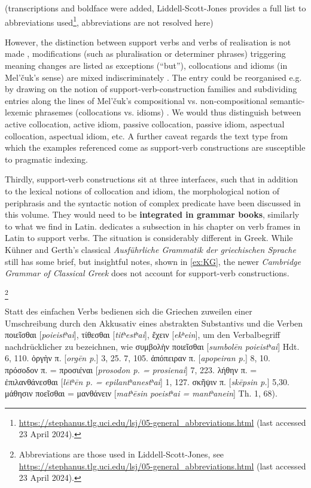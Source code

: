\documentclass[output=paper,colorlinks,citecolor=brown]{langscibook}
\begin{document}
(transcriptions and boldface were added, Liddell-Scott-Jones provides a full list to abbreviations used\footnote{\url{https://stephanus.tlg.uci.edu/lsj/05-general_abbreviations.html} (last accessed 23 April 2024).}, abbreviations are not resolved here)
\z


However, the distinction between support verbs and verbs of realisation is not made \citep{fendelHavenGotClue2023}, modifications (such as pluralisation or determiner phrases) triggering meaning changes are listed as exceptions (“but”), collocations and idioms (in Mel’čuk’s sense) are mixed indiscriminately \citep{fendelSupportverbConstructionsObjects2023, fendelNotSemilexicalAffixessubmitted}. The entry could be reorganised e.g. by drawing on the notion of support-verb-construction families and subdividing entries along the lines of Mel’čuk’s compositional vs. non-compositional semantic-lexemic phrasemes (collocations vs. idioms) \citep{melcuk_general_2023}. We would thus distinguish between active collocation, active idiom, passive collocation, passive idiom, aspectual collocation, aspectual idiom, etc. A further caveat regards the text type from which the examples referenced come as support-verb constructions are susceptible to pragmatic indexing. 


Thirdly, support-verb constructions sit at three interfaces, such that in addition to the lexical notions of collocation and idiom, the morphological notion of periphrasis and the syntactic notion of complex predicate have been discussed in this volume. They would need to be \textbf{integrated in grammar books}, similarly to what we find in Latin. \citet[74–77]{pinksterOxfordLatinSyntax2015} dedicates a subsection in his chapter on verb frames in Latin to support verbs. The situation is considerably different in Greek. While Kühner and Gerth’s classical \textit{Ausführliche Grammatik der griechischen Sprache} still has some brief, but insightful notes, shown in \ref{ex:KG}, the newer \textit{Cambridge Grammar of Classical Greek} \citep{vanemdeboasCambridgeGrammarClassical2019} does not account for support-verb constructions. 


\eanoraggedright\label{ex:KG}
\citealt[322]{kuehnerAusfuehrlicheGrammatikGriechischen1894}\footnote{Abbreviations are those used in Liddell-Scott-Jones, see \url{https://stephanus.tlg.uci.edu/lsj/05-general_abbreviations.html} (last accessed 23 April 2024).} 


Statt des einfachen Verbs bedienen sich die Griechen zuweilen einer Umschreibung durch den Akkusativ eines abstrakten Substantivs und die Verben ποιεῖσθαι [\textit{poieistʰai}], τίθεσθαι [\textit{titʰestʰai}], ἔχειν [\textit{ekʰein}], um den Verbalbegriff nachdrücklicher zu bezeichnen, wie συμβολὴν ποιεῖσθαι [\textit{sumbolēn poieistʰai}] Hdt. 6, 110. ὀργὴν π. [\textit{orgēn p.}]  3, 25. 7, 105. ἀπόπειραν π. [\textit{apopeiran p.}] 8, 10. πρόσοδον π. = προσιέναι [\textit{prosodon p. = prosienai}] 7, 223. λήθην π. = ἐπιλανθάνεσθαι [\textit{lētʰēn p. = epilantʰanestʰai}] 1, 127. σκῆψιν π. [\textit{skēpsin p.}] 5,30. μάθησιν ποεῖσθαι = μανθάνειν [\textit{matʰēsin poeistʰai = mantʰanein}] Th. 1, 68).
\end{document}
